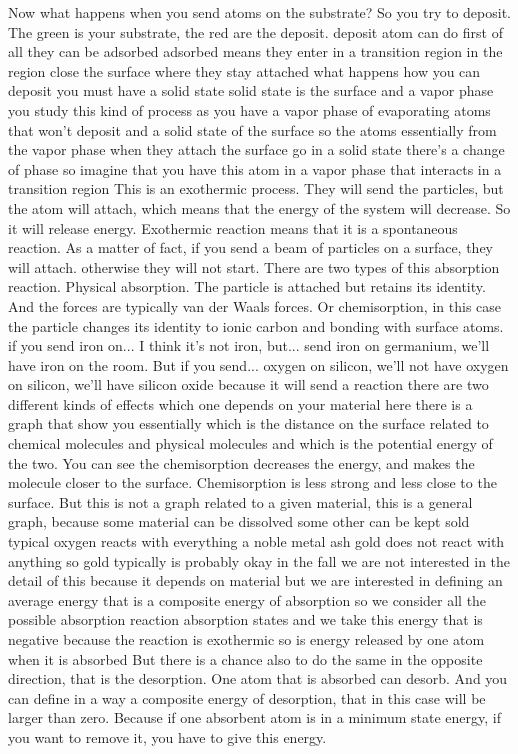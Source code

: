 Now what happens when you send atoms on the substrate? So you try to deposit. The green is your substrate, the red are the deposit. deposit atom can do first of all they can be adsorbed adsorbed means they enter in a transition region in the region close the surface where they stay attached what happens how you can deposit you must have a solid state solid state is the surface and a vapor phase you study this kind of process as you have a vapor phase of evaporating atoms that won't deposit and a solid state of the surface so the atoms essentially from the vapor phase when they attach the surface go in a solid state there's a change of phase so imagine that you have this atom in a vapor phase that interacts in a transition region This is an exothermic process. They will send the particles, but the atom will attach, which means that the energy of the system will decrease. So it will release energy. Exothermic reaction means that it is a spontaneous reaction. As a matter of fact, if you send a beam of particles on a surface, they will attach. otherwise they will not start. There are two types of this absorption reaction. Physical absorption. The particle is attached but retains its identity. And the forces are typically van der Waals forces. Or chemisorption, in this case the particle changes its identity to ionic carbon and bonding with surface atoms. if you send iron on... I think it's not iron, but... send iron on germanium, we'll have iron on the room. But if you send... oxygen on silicon, we'll not have oxygen on silicon, we'll have silicon oxide because it will send a reaction there are two different kinds of effects which one depends on your material here there is a graph that show you essentially which is the distance on the surface related to chemical molecules and physical molecules and which is the potential energy of the two. You can see the chemisorption decreases the energy, and makes the molecule closer to the surface. Chemisorption is less strong and less close to the surface. But this is not a graph related to a given material, this is a general graph, because some material can be dissolved some other can be kept sold typical oxygen reacts with everything a noble metal ash gold does not react with anything so gold typically is probably okay in the fall we are not interested in the detail of this because it depends on material but we are interested in defining an average energy that is a composite energy of absorption so we consider all the possible absorption reaction absorption states and we take this energy that is negative because the reaction is exothermic so is energy released by one atom when it is absorbed But there is a chance also to do the same in the opposite direction, that is the desorption. One atom that is absorbed can desorb. And you can define in a way a composite energy of desorption, that in this case will be larger than zero. Because if one absorbent atom is in a minimum state energy, if you want to remove it, you have to give this energy.
